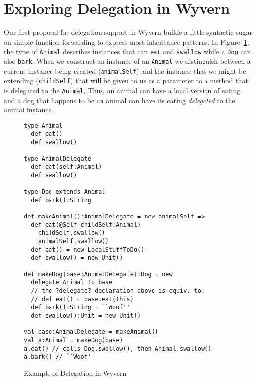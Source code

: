 \documentclass[preprint,10pt]{sigplanconf}
\begin{document}

\section{Exploring Delegation in Wyvern}

Our first proposal for delegation support in Wyvern builds a little syntactic sugar on simple function forwarding to express most inheritance patterns.  In Figure~\ref{f:wyvern-delegation}, the type of \texttt{Animal} describes instances that can \texttt{eat} and \texttt{swallow} while a \texttt{Dog} can also \texttt{bark}. When we construct an instance of an \texttt{Animal} we distinguish between a current instance being created (\texttt{animalSelf}) and the instance that we might be extending (\texttt{childSelf}) that will be given to us as a parameter to a method that is delegated to the \texttt{Animal}. Thus, an animal can have a local version of eating and a dog that happens to be an animal can have its eating \textit{delegated} to the animal instance.

\begin{figure}
\begin{lstlisting}
type Animal
  def eat()
  def swallow()

type AnimalDelegate
  def eat(self:Animal)
  def swallow()

type Dog extends Animal
  def bark():String

def makeAnimal():AnimalDelegate = new animalSelf =>
  def eat(@Self childSelf:Animal)
    childSelf.swallow()
    animalSelf.swallow()
  def eat() = new LocalStuffToDo()
  def swallow() = new Unit()

def makeDog(base:AnimalDelegate):Dog = new
  delegate Animal to base
  // the ?delegate? declaration above is equiv. to:
  // def eat() = base.eat(this)
  def bark():String = ``Woof''
  def swallow():Unit = new Unit()

val base:AnimalDelegate = makeAnimal()
val a:Animal = makeDog(base)
a.eat() // calls Dog.swallow(), then Animal.swallow()
a.bark() // ``Woof''
\end{lstlisting}
\caption{Example of Delegation in Wyvern}
\label{f:wyvern-delegation}
\end{figure}
\end{document}
